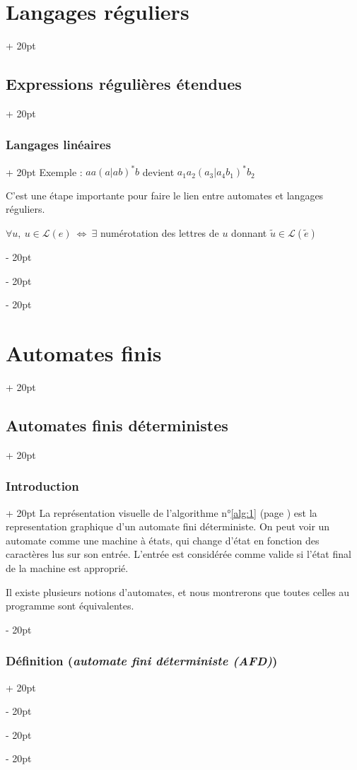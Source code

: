 \documentclass[a4paper, 12pt, twoside]{article}
\newcommand{\ssi}{\ \Leftrightarrow \ }
\newcommand{\ind}[1][20pt]{\advance\leftskip + #1}
\newcommand{\deind}[1][20pt]{\advance\leftskip - #1}
\newenvironment{indt}[2][20pt]{#2 \par \ind[#1]}{\par \deind} %
\begin{document}
\begin{indt}{\section{Langages réguliers}}
\begin{indt}{\subsection{Expressions régulières étendues}}
\begin{indt}{\subsubsection{Langages linéaires}}
                Exemple : $aa(a | ab)^*b$ devient $a_1a_2(a_3 | a_4b_1)^*b_2$

                C'est une étape importante pour faire le lien entre automates et langages réguliers.

                 $\forall u,\ u \in \mathcal L(e) \ssi \exists$ numérotation des lettres de $u$ donnant $\tilde u \in \mathcal L(\tilde e)$
            \end{indt}
        \end{indt}
    \end{indt}

    \vspace{12pt}
    
    \begin{indt}{\section{Automates finis}}
        \label{2}

        \begin{indt}{\subsection{Automates finis déterministes}}
            \begin{indt}{\subsubsection{Introduction}}
                La représentation visuelle de l'algorithme n°\ref{alg:1} (page \pageref{alg:1}) est la representation graphique d'un automate fini déterministe.
                On peut voir un automate comme une machine à états, qui change d'état en fonction des caractères lus sur son entrée. L'entrée est considérée comme valide si l'état final de la machine est approprié.

                Il existe plusieurs notions d'automates, et nous montrerons que toutes celles au programme sont équivalentes.
            \end{indt}

            \vspace{12pt}
            
            \begin{indt}{\subsubsection{Définition (\textit{automate fini déterministe (AFD)})}}
                \label{2.1.2}


\end{indt}
\end{indt}
\end{indt}
\end{document}
